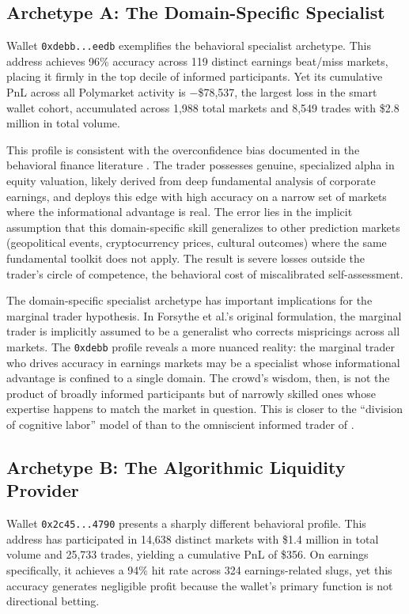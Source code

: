 \documentclass[11pt]{article}
\begin{document}
\subsection{Archetype A: The Domain-Specific Specialist}

Wallet \texttt{0xdebb...eedb} exemplifies the behavioral specialist archetype. This address achieves 96\% accuracy across 119 distinct earnings beat/miss markets, placing it firmly in the top decile of informed participants. Yet its cumulative PnL across all Polymarket activity is $-$\$78,537, the largest loss in the smart wallet cohort, accumulated across 1,988 total markets and 8,549 trades with \$2.8 million in total volume.

This profile is consistent with the overconfidence bias documented in the behavioral finance literature \citep{daniel1998investor}. The trader possesses genuine, specialized alpha in equity valuation, likely derived from deep fundamental analysis of corporate earnings, and deploys this edge with high accuracy on a narrow set of markets where the informational advantage is real. The error lies in the implicit assumption that this domain-specific skill generalizes to other prediction markets (geopolitical events, cryptocurrency prices, cultural outcomes) where the same fundamental toolkit does not apply. The result is severe losses outside the trader's circle of competence, the behavioral cost of miscalibrated self-assessment.

The domain-specific specialist archetype has important implications for the marginal trader hypothesis. In Forsythe et al.'s original formulation, the marginal trader is implicitly assumed to be a generalist who corrects mispricings across all markets. The \texttt{0xdebb} profile reveals a more nuanced reality: the marginal trader who drives accuracy in earnings markets may be a specialist whose informational advantage is confined to a single domain. The crowd's wisdom, then, is not the product of broadly informed participants but of narrowly skilled ones whose expertise happens to match the market in question. This is closer to the ``division of cognitive labor'' model of \citet{page2012prediction} than to the omniscient informed trader of \citet{kyle1985continuous}.

\subsection{Archetype B: The Algorithmic Liquidity Provider}

Wallet \texttt{0x2c45...4790} presents a sharply different behavioral profile. This address has participated in 14,638 distinct markets with \$1.4 million in total volume and 25,733 trades, yielding a cumulative PnL of \$356. On earnings specifically, it achieves a 94\% hit rate across 324 earnings-related slugs, yet this accuracy generates negligible profit because the wallet's primary function is not directional betting.
\end{document}
